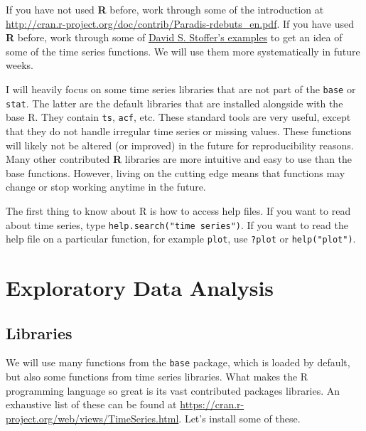 \documentclass[]{book}
\begin{document}
If you have not used \textbf{R} before, work through some of the
introduction at
\url{http://cran.r-project.org/doc/contrib/Paradis-rdebuts_en.pdf}. If
you have used \textbf{R} before, work through some of
\href{http://www.stat.pitt.edu/stoffer/tsa4/}{David S. Stoffer's
examples} to get an idea of some of the time series functions. We will
use them more systematically in future weeks.

I will heavily focus on some time series libraries that are not part of
the \texttt{base} or \texttt{stat}. The latter are the default libraries
that are installed alongside with the base R. They contain \texttt{ts},
\texttt{acf}, etc. These standard tools are very useful, except that
they do not handle irregular time series or missing values. These
functions will likely not be altered (or improved) in the future for
reproducibility reasons. Many other contributed \textbf{R} libraries are
more intuitive and easy to use than the base functions. However, living
on the cutting edge means that functions may change or stop working
anytime in the future.

The first thing to know about R is how to access help files. If you want
to read about time series, type \texttt{help.search("time\ series")}. If
you want to read the help file on a particular function, for example
\texttt{plot}, use \texttt{?plot} or \texttt{help("plot")}.

\hypertarget{exploratory-data-analysis}{%
\section{Exploratory Data Analysis}\label{exploratory-data-analysis}}

\hypertarget{libraries}{%
\subsection{Libraries}\label{libraries}}

We will use many functions from the \texttt{base} package, which is
loaded by default, but also some functions from time series libraries.
What makes the R programming language so great is its vast contributed
packages libraries. An exhaustive list of these can be found at
\url{https://cran.r-project.org/web/views/TimeSeries.html}. Let's
install some of these.
\end{document}
